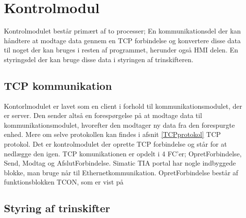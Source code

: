 
\section{Kontrolmodul}

Kontrolmodulet består primært af to processer; En kommunikationsdel der kan håndtere at modtage data gennem en TCP forbindelse og konvertere disse data til noget der kan bruges i resten af programmet, herunder også HMI delen. En styringsdel der kan bruge disse data i styringen af trinskifteren.

\subsection{TCP kommunikation}
Kontorlmodulet er lavet som en client i forhold til kommunikationsmodulet, der er server. Den sender altså en forespørgelse på at modtage data til kommunikationsmodulet, hvorefter den modtager ny data fra den forespurgte enhed. Mere om selve protokollen kan findes i afsnit \ref{TCPprotokol} TCP protokol. Det er kontrolmodulet der oprette TCP forbindelse og står for at nedlægge den igen.
TCP komunikationen er opdelt i 4 FC'er; OpretForbindelse, Send, Modtag og AfslutForbindelse. Simatic TIA portal har nogle indbyggede blokke, man bruge når til Ethernetkommunikation.
OpretForbindelse består af funktionsblokken TCON, som er vist på 


\subsection{Styring af trinskifter}